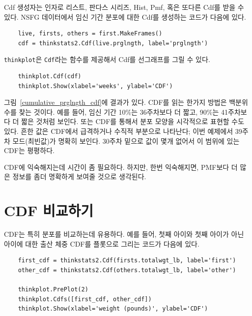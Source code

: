 Cdf 생성자는 인자로 리스트, 판다스 시리즈, Hist, Pmf, 혹은 또다른 Cdf를 받을 수 있다. NSFG 데이터에서 임신 기간 분포에 대한 Cdf를 생성하는 코드가 다음에 있다. 


\begin{verbatim}
    live, firsts, others = first.MakeFrames()
    cdf = thinkstats2.Cdf(live.prglngth, label='prglngth')
\end{verbatim}


{\tt thinkplot}은 {\tt Cdf}라는 함수를 제공해서 Cdf를 선그래프를 그릴 수 있다.

\begin{verbatim}
    thinkplot.Cdf(cdf)
    thinkplot.Show(xlabel='weeks', ylabel='CDF')
\end{verbatim}



그림~\ref{cumulative_prglngth_cdf}에 결과가 있다.
CDF를 읽는 한가지 방법은 백분위수를 찾는 것이다.
예를 들어, 임신 기간 10\%는 36주차보다 더 짧고, 90\%는 41주차보다 더 짧은 것처럼 보인다. 또는 CDF를 통해서 분포 모양을 시각적으로 표현할 수도 있다. 흔한 값은 CDF에서 급격하거나 수직적 부분으로 나타난다; 이번 예제에서 39주차 모드(최빈값)가 명확히 보인다. 30주차 밑으로 값이 몇개 없어서 이 범위에 있는 CDF는 평평하다.

CDF에 익숙해지는데 시간이 좀 필요하다. 하지만, 한번 익숙해지면, PMF보다 더 많은 정보를 좀더 명확하게 보여줄 것으로 생각된다.


\section{CDF 비교하기}
\label{birth_weights}

CDF는 특히 분포를 비교하는데 유용하다.
예를 들어, 첫째 아이와 첫째 아이가 아닌 아이에 대한 출산 체중 CDF를 플롯으로 그리는 코드가 다음에 있다.

\begin{verbatim}
    first_cdf = thinkstats2.Cdf(firsts.totalwgt_lb, label='first')
    other_cdf = thinkstats2.Cdf(others.totalwgt_lb, label='other')

    thinkplot.PrePlot(2)
    thinkplot.Cdfs([first_cdf, other_cdf])
    thinkplot.Show(xlabel='weight (pounds)', ylabel='CDF')
\end{verbatim}


